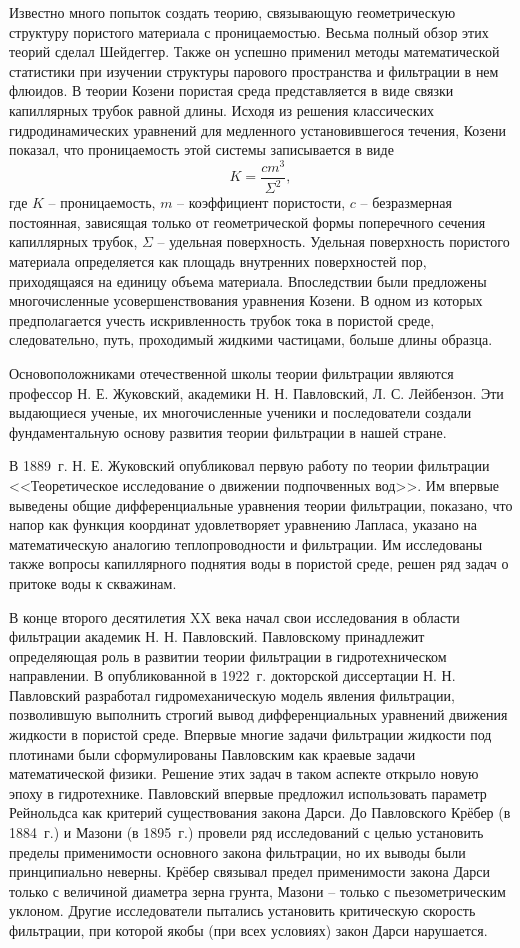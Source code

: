 Известно много попыток создать теорию, связывающую геометрическую структуру пористого материала с проницаемостью. Весьма полный обзор этих теорий сделал Шейдеггер. Также он успешно применил методы математической
статистики при изучении структуры парового пространства и фильтрации в нем флюидов. В теории Козени пористая среда представляется в виде
связки капиллярных трубок равной длины. Исходя из решения классических гидродинамических уравнений для медленного установившегося течения, Козени показал, что проницаемость этой системы записывается в виде
\begin{equation}
K=\frac{cm^3}{\Sigma^2}, 
\end{equation}
 где $K$ -- проницаемость, $m$ -- коэффициент пористости, $c$ -- безразмерная постоянная, зависящая только от геометрической формы поперечного сечения капиллярных трубок, $\Sigma$ -- удельная поверхность.
Удельная поверхность пористого материала определяется как площадь внутренних поверхностей пор, приходящаяся на единицу объема материала. Впоследствии были предложены многочисленные усовершенствования уравнения Козени.
В одном из которых предполагается учесть искривленность трубок тока в пористой среде, следовательно, путь, проходимый жидкими частицами, больше длины образца.

Основоположниками отечественной школы теории фильтрации являются профессор Н. Е. Жуковский, академики Н. Н. Павловский, Л. С. Лейбензон. Эти выдающиеся ученые, их многочисленные ученики и последователи
создали фундаментальную основу развития теории фильтрации в нашей стране.

В 1889~г. Н. Е. Жуковский опубликовал первую работу по теории фильтрации <<Теоретическое исследование о движении подпочвенных вод>>. Им впервые выведены общие дифференциальные уравнения теории фильтрации, показано, что
напор как функция координат удовлетворяет уравнению Лапласа, указано на математическую аналогию теплопроводности и фильтрации. Им исследованы также вопросы капиллярного поднятия воды в пористой среде, решен ряд задач
о притоке воды к скважинам.

В конце второго десятилетия XX века начал свои исследования в области фильтрации академик Н. Н. Павловский. Павловскому принадлежит определяющая роль в развитии теории фильтрации в гидротехническом направлении.
В опубликованной в 1922~г. докторской диссертации Н. Н. Павловский разработал гидромеханическую модель явления фильтрации, позволившую выполнить строгий вывод дифференциальных уравнений движения жидкости в пористой среде. 
Впервые многие задачи фильтрации жидкости под плотинами были сформулированы
Павловским как краевые задачи математической физики. Решение этих задач в таком аспекте открыло новую эпоху в гидротехнике. Павловский впервые предложил использовать параметр Рейнольдса как критерий существования закона
Дарси. До Павловского Крёбер (в 1884~г.) и Мазони (в 1895~г.) провели ряд исследований с целью установить пределы применимости основного закона фильтрации, но их выводы были принципиально неверны. Крёбер связывал предел
применимости закона Дарси только с величиной диаметра зерна грунта, Мазони -- только с пьезометрическим уклоном. Другие исследователи пытались установить критическую скорость фильтрации, при которой якобы (при всех условиях)
закон Дарси нарушается. 

